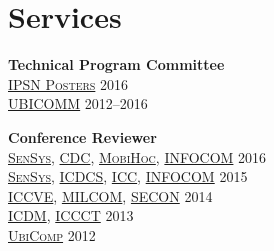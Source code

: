
\section{\sc Services}
{\bf Technical Program Committee}\\
{\href{http://ipsn.acm.org/2016/posters.html}{\textsc{IPSN Posters}}} \hfill 2016\\
{\href{http://www.iaria.org/conferences2016/UBICOMM16.html}{\textsc{UBICOMM}}} \hfill 2012--2016\\
\vspace{-0.6cm}

{\bf Conference Reviewer}\\
{\href{http://sensys.acm.org/2016/}{\textsc{SenSys}}}, {\href{http://cdc2016.ieeecss.org/}{\textsc{CDC}}}, {\href{http://www.sigmobile.org/mobihoc/2016/}{\textsc{MobiHoc}}}, {\href{http://infocom2016.ieee-infocom.org/}{\textsc{INFOCOM}}} \hfill 2016\\
{\href{http://sensys.acm.org/2015/}{\textsc{SenSys}}}, {\href{http://icdcs-2015.cse.ohio-state.edu/}{\textsc{ICDCS}}}, {\href{http://icc2015.ieee-icc.org/}{\textsc{ICC}}}, {\href{http://infocom2015.ieee-infocom.org/}{\textsc{INFOCOM}}} \hfill 2015\\
{\href{http://www.iccve.org/2014/}{\textsc{ICCVE}}}, {\href{http://www.milcom.org/2014/}{\textsc{MILCOM}}}, {\href{http://secon2014.ieee-secon.org}{\textsc{SECON}}} \hfill 2014\\
{\href{http://icdm2013.rutgers.edu}{\textsc{ICDM}}}, {\href{http://www.mnnit.ac.in/iccct2013}{\textsc{ICCCT}}} \hfill 2013\\
{\href{http://www.ubicomp.org/ubicomp2012}{\textsc{UbiComp}}} \hfill 2012\\
\vspace{-0.6cm}

